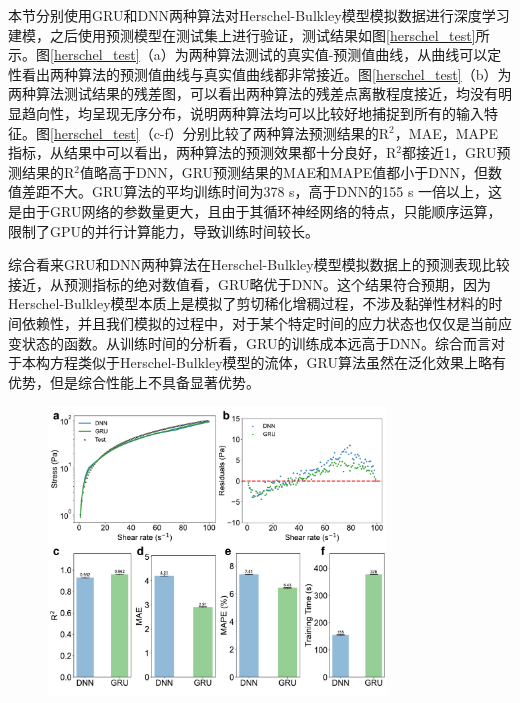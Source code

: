 本节分别使用GRU和DNN两种算法对Herschel-Bulkley模型模拟数据进行深度学习建模，之后使用预测模型在测试集上进行验证，测试结果如图\ref{herschel_test}所示。图\ref{herschel_test}（a）为两种算法测试的真实值-预测值曲线，从曲线可以定性看出两种算法的预测值曲线与真实值曲线都非常接近。图\ref{herschel_test}（b）为两种算法测试结果的残差图，可以看出两种算法的残差点离散程度接近，均没有明显趋向性，均呈现无序分布，说明两种算法均可以比较好地捕捉到所有的输入特征。图\ref{herschel_test}（c-f）分别比较了两种算法预测结果的R$^2$，MAE，MAPE指标，从结果中可以看出，两种算法的预测效果都十分良好，R$^2$都接近1，GRU预测结果的R$^2$值略高于DNN，GRU预测结果的MAE和MAPE值都小于DNN，但数值差距不大。GRU算法的平均训练时间为378 s，高于DNN的155 s 一倍以上，这是由于GRU网络的参数量更大，且由于其循环神经网络的特点，只能顺序运算，限制了GPU的并行计算能力，导致训练时间较长。

综合看来GRU和DNN两种算法在Herschel-Bulkley模型模拟数据上的预测表现比较接近，从预测指标的绝对数值看，GRU略优于DNN。这个结果符合预期，因为Herschel-Bulkley模型本质上是模拟了剪切稀化增稠过程，不涉及黏弹性材料的时间依赖性，并且我们模拟的过程中，对于某个特定时间的应力状态也仅仅是当前应变状态的函数。从训练时间的分析看，GRU的训练成本远高于DNN。综合而言对于本构方程类似于Herschel-Bulkley模型的流体，GRU算法虽然在泛化效果上略有优势，但是综合性能上不具备显著优势。
\begin{figure}[H]
  \centering
  \includegraphics[width=0.8\textwidth]{Fig/Herschel_test.pdf}
\end{figure}
